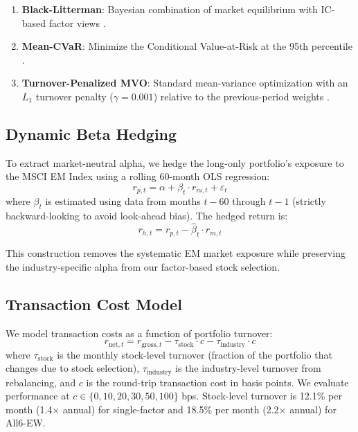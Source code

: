 \documentclass[12pt,a4paper]{article}
\begin{document}
\begin{enumerate}
    \item \textbf{Black-Litterman}: Bayesian combination of market equilibrium with IC-based factor views \citep{blacklitterman1992}.

    \item \textbf{Mean-CVaR}: Minimize the Conditional Value-at-Risk at the 95th percentile \citep{rockafellar2000}.

    \item \textbf{Turnover-Penalized MVO}: Standard mean-variance optimization with an $L_1$ turnover penalty ($\gamma = 0.001$) relative to the previous-period weights \citep{olivaresdemiguel2018}.
\end{enumerate}

\subsection{Dynamic Beta Hedging}

To extract market-neutral alpha, we hedge the long-only portfolio's exposure to the MSCI EM Index using a rolling 60-month OLS regression:
\begin{equation}
    r_{p,t} = \alpha + \beta_t \cdot r_{m,t} + \varepsilon_t
\end{equation}
where $\beta_t$ is estimated using data from months $t-60$ through $t-1$ (strictly backward-looking to avoid look-ahead bias). The hedged return is:
\begin{equation}
    r_{h,t} = r_{p,t} - \hat{\beta}_t \cdot r_{m,t}
\end{equation}

This construction removes the systematic EM market exposure while preserving the industry-specific alpha from our factor-based stock selection.

\subsection{Transaction Cost Model}

We model transaction costs as a function of portfolio turnover:
\begin{equation}
    r_{\text{net},t} = r_{\text{gross},t} - \tau_{\text{stock}} \cdot c - \tau_{\text{industry}} \cdot c
\end{equation}
where $\tau_{\text{stock}}$ is the monthly stock-level turnover (fraction of the portfolio that changes due to stock selection), $\tau_{\text{industry}}$ is the industry-level turnover from rebalancing, and $c$ is the round-trip transaction cost in basis points. We evaluate performance at $c \in \{0, 10, 20, 30, 50, 100\}$ bps. Stock-level turnover is 12.1\% per month (1.4$\times$ annual) for single-factor and 18.5\% per month (2.2$\times$ annual) for All6-EW.
\end{document}
